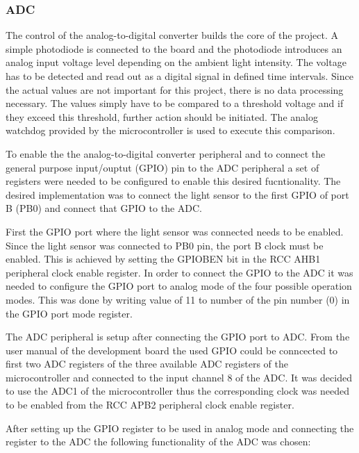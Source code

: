 \subsubsection{ADC}
The control of the analog-to-digital converter builds the core of the project. A simple photodiode is connected to the board and the photodiode introduces an analog input voltage level depending on the ambient light intensity. The voltage has to be detected and read out as a digital signal in defined time intervals. Since the actual values are not important for this project, there is no data processing necessary. The values simply have to be compared to a threshold voltage and if they exceed this threshold, further action should be initiated. The analog watchdog provided by the microcontroller is used to execute this comparison.\\
\par
To enable the the analog-to-digital converter peripheral and to connect the general purpose input/ouptut (GPIO) pin to the ADC peripheral a set of registers were needed to be configured to enable this desired fucntionality. The desired implementation was to connect the light sensor to the first GPIO of port B (PB0) and connect that GPIO to the ADC.\\
\par
First the GPIO port where the light sensor was connected needs to be enabled. Since the light sensor was connected to PB0 pin, the port B clock must be enabled. This is achieved by setting the GPIOBEN bit in the RCC AHB1 peripheral clock enable register. In order to connect the GPIO to the ADC it was needed to configure the GPIO port to analog mode of the four possible operation modes. This was done by writing value of 11 to number of the pin number (0) in the GPIO port mode register.\\
\par
The ADC peripheral is setup after connecting the GPIO port to ADC. From the user manual of the development board \cite{UsrManual} the used GPIO could be conncected to first two ADC registers of the three available ADC registers of the microcontroller and connected to the input channel 8 of the ADC. It was decided to use the ADC1 of the microcontroller thus the corresponding clock was needed to be enabled from the RCC APB2 peripheral clock enable register.\\
\par
After setting up the GPIO register to be used in analog mode and connecting the register to the ADC the following functionality of the ADC was chosen:
